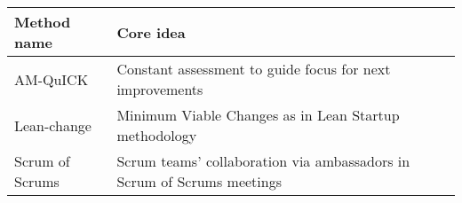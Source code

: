 \begin{center}
\label{adoptionmethodtable}
\begin{tabular}{p{8em} p{25em}}
    \bfseries{Method name} & \bfseries{Core idea} \\
    \hline
    AM-QuICK & Constant assessment to guide focus for next improvements \\
    Lean-change & Minimum Viable Changes as in Lean Startup methodology \\
    Scrum of Scrums & Scrum teams' collaboration via ambassadors in Scrum of
	Scrums meetings \\
\end{tabular}
\end{center}
